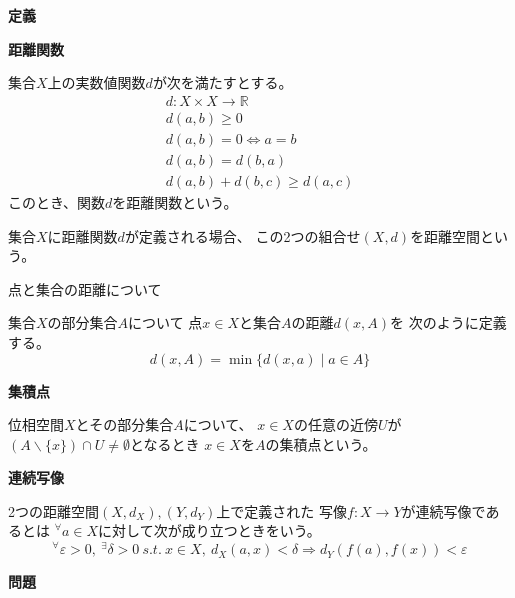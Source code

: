 \documentclass[12pt,b5paper]{ltjsarticle}
\begin{document}
\hrulefill
\textbf{定義}
\hrulefill

\textbf{距離関数}

集合$X$上の実数値関数$d$が次を満たすとする。
\begin{gather}
 d: X\times X \to \mathbb{R}\\
 d(a,b)\geq 0\\
 d(a,b)= 0 \Leftrightarrow a=b\\
 d(a,b) = d(b,a)\\
 d(a,b) + d(b,c) \geq d(a,c)
\end{gather}
このとき、関数$d$を距離関数という。

集合$X$に距離関数$d$が定義される場合、
この2つの組合せ$(X,d)$を距離空間という。



点と集合の距離について

集合$X$の部分集合$A$について
点$x\in X$と集合$A$の距離$d(x,A)$を
次のように定義する。
\begin{equation}
 d(x,A) = \min \{ d(x,a) \mid a\in A\}
\end{equation}


\textbf{集積点}

位相空間$X$とその部分集合$A$について、
$x\in X$の任意の近傍$U$が
$(A\backslash \{x\})\cap U \ne \emptyset$となるとき
$x\in X$を$A$の集積点という。


\textbf{連続写像}

2つの距離空間$(X,d_X),(Y,d_Y)$上で定義された
写像$f:X\to Y$が連続写像であるとは
${}^{\forall}a\in X$に対して次が成り立つときをいう。
\begin{equation}
 {}^{\forall}\varepsilon>0,\ {}^{\exists}\delta>0\
  s.t.\ x\in X ,\ d_X(a,x)<\delta \Rightarrow d_Y(f(a),f(x))<\varepsilon
\end{equation}




\hrulefill
\textbf{問題}
\hrulefill
\end{document}
